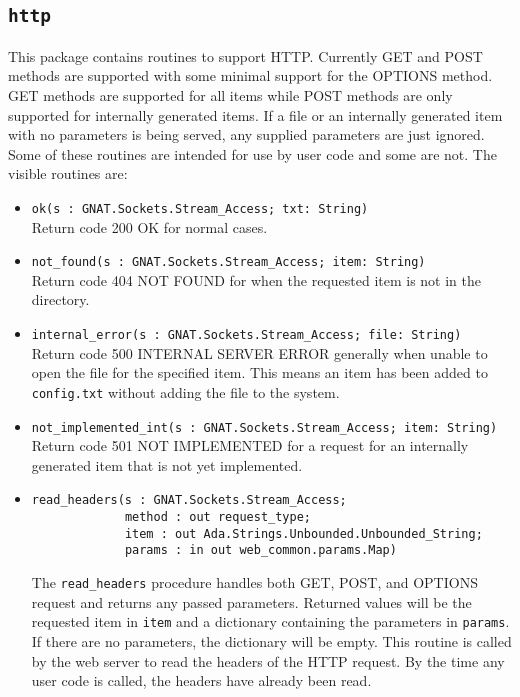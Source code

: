 \documentclass[10pt, openany]{book}
\begin{document}
\subsection{\texttt{http}}
This package contains routines to support HTTP.  Currently GET and POST methods are supported with some minimal support for the OPTIONS method.  GET methods are supported for all items while POST methods are only supported for internally generated items.  If a file or an internally generated item with no parameters is being served, any supplied parameters are just ignored. Some of these routines are intended for use by user code and some are not.  The visible routines are:
\begin{itemize}
  \item \verb|ok(s : GNAT.Sockets.Stream_Access; txt: String)|\\
  Return code 200 OK for normal cases.
  \item \verb|not_found(s : GNAT.Sockets.Stream_Access; item: String)|\\
  Return code 404 NOT FOUND for when the requested item is not in the directory.
  \item \verb|internal_error(s : GNAT.Sockets.Stream_Access; file: String)|\\
  Return code 500 INTERNAL SERVER ERROR generally when unable to open the file for the specified item.  This means an item has been added to \texttt{config.txt} without adding the file to the system.
  \item \verb|not_implemented_int(s : GNAT.Sockets.Stream_Access; item: String)|\\
  Return code 501 NOT IMPLEMENTED for a request for an internally generated item that is not yet implemented.
  \item \begin{lstlisting}read_headers(s : GNAT.Sockets.Stream_Access;
             method : out request_type;
             item : out Ada.Strings.Unbounded.Unbounded_String;
             params : in out web_common.params.Map)
            \end{lstlisting}
   The \texttt{read\_headers} procedure handles both GET, POST, and OPTIONS request and returns any passed parameters.  Returned values will be the requested item in \texttt{item} and a dictionary containing the parameters in \texttt{params}.  If there are no parameters, the dictionary will be empty.  This routine is called by the web server to read the headers of the HTTP request.  By the time any user code is called, the headers have already been read.
\end{itemize}
\end{document}
